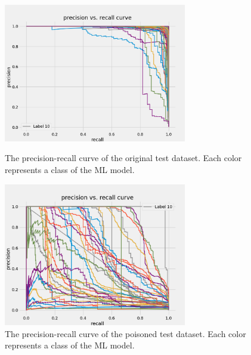 \begin{figure}[!tbp]
  \centering
  \begin{minipage}[b]{0.4\textwidth}
    \includegraphics[width=8cm]{pictures/precision_recall_curve.png}
    \caption{The precision-recall curve of the original test dataset. Each color represents a class of the ML model.}
    \label{fig:precision_recall_curve}
  \end{minipage}
  \hfill
  \begin{minipage}[b]{0.4\textwidth}
    \includegraphics[width=8cm]{pictures/poisoned_precision_recall.png}
    \caption{The precision-recall curve of the poisoned test dataset. Each color represents a class of the ML model.}
    \label{fig:poisoned_precision_recall}
  \end{minipage}
\end{figure}

